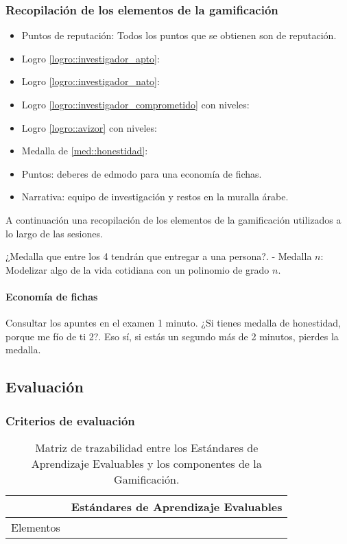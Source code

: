 \subsubsection{Recopilación de los elementos de la gamificación }

\begin{itemize}
	\item Puntos de reputación: Todos los puntos que se obtienen son de reputación.
	\item Logro \ref{logro::investigador_apto}:
	\item Logro \ref{logro::investigador_nato}:
	\item Logro \ref{logro::investigador_comprometido} con niveles:
	\item Logro \ref{logro::avizor} con niveles:
	\item Medalla de \ref{med::honestidad}:
	\item Puntos: deberes de edmodo para una economía de fichas.
	\item Narrativa: equipo de investigación y restos en la muralla árabe.
\end{itemize}


A continuación una recopilación de los elementos de la gamificación utilizados a lo largo de las sesiones.

¿Medalla que entre los 4 tendrán que entregar a una persona?. 
- Medalla $n$: Modelizar algo de la vida cotidiana con un polinomio de grado $n$.

\paragraph{Economía de fichas}
%
Consultar los apuntes en el examen 1 minuto. ¿Si tienes medalla de honestidad, porque me fío de ti 2?. Eso sí, si estás un segundo más de 2 minutos, pierdes la medalla.

\subsection{Evaluación}

\subsubsection{Criterios de evaluación}


\begin{table}[hbtp]
\caption{Matriz de trazabilidad entre los Estándares de Aprendizaje Evaluables y los componentes de la Gamificación.}
\label{Trazabilidad}
\begin{tabular}{c|c}
& Estándares de Aprendizaje Evaluables\\\hline
Elementos & \\\hline
\end{tabular}
\end{table}










